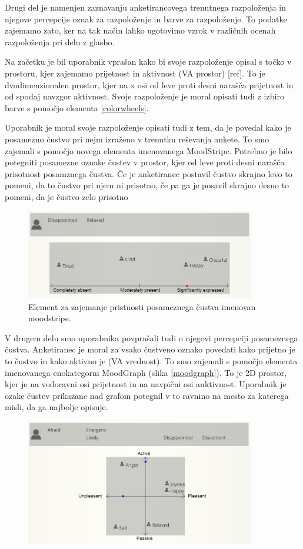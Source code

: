 \documentclass[a4paper, 12pt]{book}
\begin{document}
{Drugi del je namenjen zaznavanju anketirancovega trenutnega razpoloženja in njegove percepcije oznak za razpoloženje in barve za razpoloženje. To podatke zajemamo zato, ker na tak način lahko ugotovimo vzrok v različnih ocenah razpoloženja pri delu z glasbo. 

Na začetku je bil uporabnik vprašan kako bi svoje razpoloženje opisal s točko v prostoru, kjer zajemamo prijetnost in aktivnost (VA prostor) [ref]. To je dvodimenzionalen prostor, kjer na x osi od leve proti desni narašča prijetnost in od spodaj navzgor aktivnost.    Svoje razpoloženje je moral opisati tudi z izbiro barve s pomočjo elementa \ref{colorwheels}. 

Uporabnik je moral svoje razpoloženje opisati tudi z tem, da je povedal kako je posamezno čustvo pri nejm izraženo v trenutku reševanja ankete. To smo zajemali s pomočjo novega elementa imenovanega MoodStripe. Potrebno je bilo potegniti posamezne oznake čustev v prostor, kjer od leve proti desni narašča prisotnost posamznega čustva. Če je anketiranec postavil čustvo skrajno levo to pomeni, da to čustvo pri njem ni prisotno, če pa ga je posavil skrajno desno to pomeni, da je čustvo zelo prisotno 

\begin{figure}[ht]
\centering
\includegraphics[width=10cm]{moodstripe.png}

\caption{Element za zajemanje pristnosti posameznega čustva imenovan moodstripe.}
\label{moodstripe}
\end{figure}

V drugem delu smo uporabnika povprašali tudi o njegovi percepciji posameznega čustva. Anketiranec je moral za vsako čustveno oznako povedati kako prijetno je to čustvo in kako aktivno je (VA vrednost). To smo zajemali s pomočjo elementa imenovanega enokategorni MoodGraph (slika \ref{moodgraph}). To je 2D prostor, kjer je na vodoravni osi prijetnost in na navpični osi anktivnost. Uporabnik je ozake čustev prikazane nad grafom potegnil v to ravnino na mesto za katerega misli, da ga najbolje opisuje. 

\begin{figure}[ht]
\centering
\includegraphics[width=10cm]{images/moodgraph.png}


\end{figure}}
\end{document}
